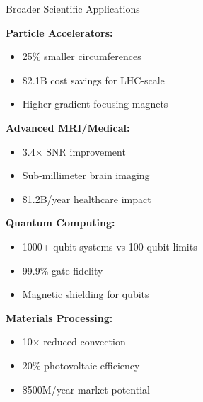 \begin{frame}{Broader Scientific Applications}
    \begin{multicols}{2}
        \textbf{Particle Accelerators:}
        \begin{itemize}
            \item 25\% smaller circumferences
            \item \$2.1B cost savings for LHC-scale
            \item Higher gradient focusing magnets
        \end{itemize}
        
        \textbf{Advanced MRI/Medical:}
        \begin{itemize}
            \item 3.4× SNR improvement
            \item Sub-millimeter brain imaging
            \item \$1.2B/year healthcare impact
        \end{itemize}
        
        \textbf{Quantum Computing:}
        \begin{itemize}
            \item 1000+ qubit systems vs 100-qubit limits
            \item 99.9\% gate fidelity
            \item Magnetic shielding for qubits
        \end{itemize}
        
        \textbf{Materials Processing:}
        \begin{itemize}
            \item 10× reduced convection
            \item 20\% photovoltaic efficiency
            \item \$500M/year market potential
        \end{itemize}
    \end{multicols}
    
    \vspace{0.3cm}
    \begin{center}
    \end{center}
\end{frame}

